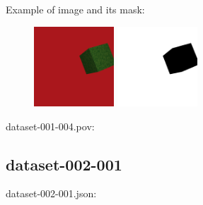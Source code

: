 Example of image and its mask:
\begin{center}
\begin{figure}[H]
\centering\includegraphics[width=3cm]{./img-001-004.png}
\centering\includegraphics[width=3cm]{./mask-001-004.png}
\end{figure}
\end{center}

dataset-001-004.pov:
\begin{scriptsize}
\begin{ttfamily}

\end{ttfamily}
\end{scriptsize}

\subsection{dataset-002-001}

dataset-002-001.json:
\begin{scriptsize}
\begin{ttfamily}

\end{ttfamily}
\end{scriptsize}

